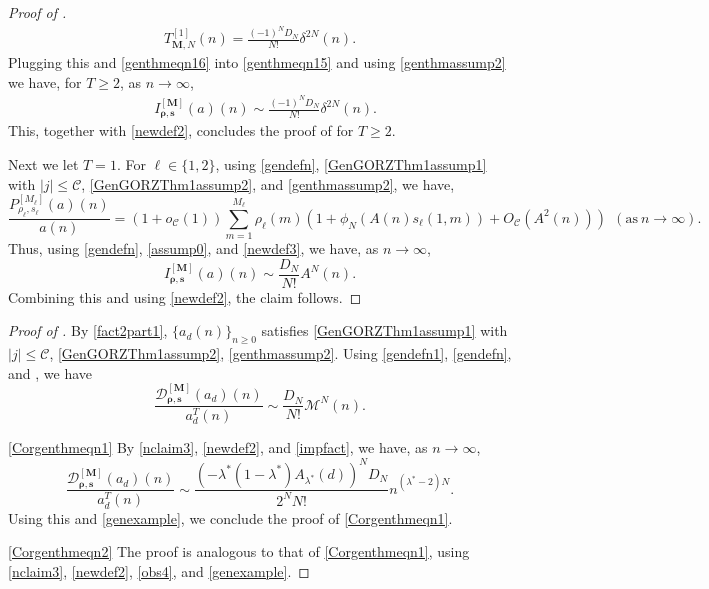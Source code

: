 \documentclass[11pt,reqno,a4paper]{amsart}
\renewcommand{\d}{{\delta}}
\renewcommand{\l}{\lambda}
\renewcommand{\(}{\left\(}
\renewcommand{\)}{\right\)}
\numberwithin{equation}{section}
\theoremstyle{plain}
\theoremstyle{definition} %
\numberwithin{equation}{section}
\begin{document}
\begin{proof}[Proof of ]
	\begin{align*}%
	T^{[1]}_{\bm{M},N}(n)=\frac{(-1)^ND_N}{N!}\d^{2N}(n).
	\end{align*}
	Plugging this and \eqref{genthmeqn16} %
	into \eqref{genthmeqn15} and using \ref{genthmassump2} we have, for $T\ge 2$, as $n\to \infty$,
	\begin{align*}%
	&I^{[\bm{M}]}_{\bm{\rho},\bm{s}}(a)(n)\sim \frac{(-1)^{N}D_N}{N!}\d^{2N}(n).%
	\end{align*}	
 This, together with \eqref{newdef2}, concludes the proof of  for $T\ge 2$.

Next we let $T=1$. For $\ell\in \{1,2\}$, using \eqref{gendefn}, \ref{GenGORZThm1assump1} with $|j|\le \mathcal{C}$, \ref{GenGORZThm1assump2}, and \ref{genthmassump2}, we have,
\[
\frac{P^{[M_{\ell}]}_{\rho_{\ell},s_{\ell}}(a)(n)}{a(n)}=\left(1\!+\!o_{\mathcal{C}}\left(1\right)\right)\! \sum_{m=1}^{M_{\ell}}\!\rho_{\ell}(m)\!\left(1\!+\!\phi_N\left(A(n)s_{\ell}(1,m)\right)\!+\!O_{\mathcal{C}}\left(A^{2}(n)\right)\right)\ \ \left(\text{as}\ n\to \infty\right).
\]
Thus, using \eqref{gendefn}, \ref{assump0}, and \eqref{newdef3}, we have, as $n\to \infty$,
\[
I^{[\bm{M}]}_{\bm{\rho},\bm{s}}(a)(n)\sim \frac{D_N}{N!}A^N(n).
\]
 Combining this and using \eqref{newdef2}, the claim follows.\qedhere 
\end{proof}



\begin{proof}[Proof of ]
 By  \ref{fact2part1}, $\{a_d(n)\}_{n\ge 0}$ satisfies \ref{GenGORZThm1assump1} with $|j|\le \mathcal{C}$, \ref{GenGORZThm1assump2}, \ref{genthmassump2}. Using \eqref{gendefn1}, \eqref{gendefn}, and , we have
 \begin{equation}\label{nclaim3}
\frac{\mathcal{D}^{[\bm{M}]}_{\bm{\rho},\bm{s}}(a_d)(n)}{a^T_d(n)}\sim \frac{D_N}{N!}\mathcal{M}^N(n). 
 \end{equation}
  

\noindent \ref{Corgenthmeqn1}  By \eqref{nclaim3}, \eqref{newdef2}, and \eqref{impfact}, we have, as $n\to \infty$, 
\[
\frac{\mathcal{D}^{[\bm{M}]}_{\bm{\rho},\bm{s}}(a_d)(n)}{a^T_d(n)}\sim \frac{\left(-\l^*(1-\l^*)A_{\l^*}(d)\right)^N\!D_N }{2^NN!}n^{\left(\l^*-2\right)N}.
\]
Using this and \eqref{genexample}, we conclude the proof of \ref{Corgenthmeqn1}. 

\noindent \ref{Corgenthmeqn2} \hspace{-0.05 cm}  The proof is analogous to that of \ref{Corgenthmeqn1}, using \eqref{nclaim3}, \eqref{newdef2}, \eqref{obs4}, and \eqref{genexample}.\qedhere 
\end{proof}
\end{document}
